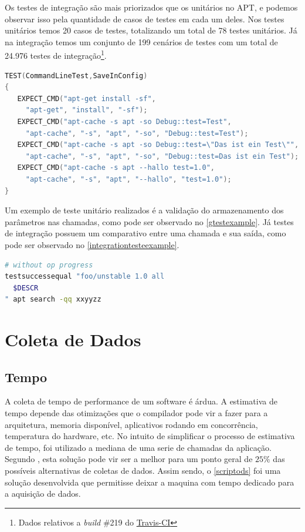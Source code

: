 Os testes de integração são mais priorizados que os unitários no APT, e podemos observar isso pela quantidade de casos de testes em cada um deles. Nos testes unitários temos 20 casos de testes, totalizando um total de 78 testes unitários. Já na integração temos um conjunto de 199 cenários de testes com um total de 24.976 testes de integração\footnote{Dados relativos a \textit{build} \#219 do \href{https://travis-ci.org/Debian/apt/builds/}{Travis-CI}}.


\begin{lstlisting}[language=C++,label=gtestexample,caption={Teste de validação de armazenamento de parâmetros}]
TEST(CommandLineTest,SaveInConfig)
{
   EXPECT_CMD("apt-get install -sf",
	 "apt-get", "install", "-sf");
   EXPECT_CMD("apt-cache -s apt -so Debug::test=Test",
	 "apt-cache", "-s", "apt", "-so", "Debug::test=Test");
   EXPECT_CMD("apt-cache -s apt -so Debug::test=\"Das ist ein Test\"",
	 "apt-cache", "-s", "apt", "-so", "Debug::test=Das ist ein Test");
   EXPECT_CMD("apt-cache -s apt --hallo test=1.0",
	 "apt-cache", "-s", "apt", "--hallo", "test=1.0");
}
\end{lstlisting}

Um exemplo de teste unitário realizados é a validação do armazenamento dos parâmetros nas chamadas, como pode ser observado no \autoref{gtestexample}. Já testes de integração possuem um comparativo entre uma chamada e sua saída, como pode ser observado no \autoref{integrationtesteexample}.

\begin{lstlisting}[language=Bash,label=integrationtesteexample,caption={Teste de verificação de saída para busca}]
# without op progress
testsuccessequal "foo/unstable 1.0 all
  $DESCR
" apt search -qq xxyyzz
\end{lstlisting}



\section{Coleta de Dados} %
\label{cha:coleta_de_dados}

\subsection*{Tempo} %
\label{sec:tempo}

A coleta de tempo de performance de um software é árdua. A estimativa de tempo depende das otimizações que o compilador pode vir a fazer para a arquitetura, memoria disponível, aplicativos rodando em concorrência, temperatura do hardware, etc. No intuito de simplificar o processo de estimativa de tempo, foi utilizado a mediana de uma serie de chamadas da aplicação. Segundo , esta solução pode vir ser a melhor para um ponto geral de $25\%$ das possíveis alternativas de coletas de dados. Assim sendo, o \autoref{scriptods} foi uma solução desenvolvida que permitisse deixar a maquina com tempo dedicado para a aquisição de dados.

